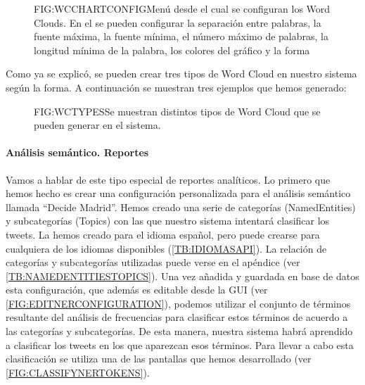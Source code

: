 \begin{figure}[Configuración de un Word Cloud]{FIG:WCCHARTCONFIG}{Menú desde el cual se configuran los Word Clouds. En el se pueden configurar la separación entre palabras, la fuente máxima, la fuente mínima, el número máximo de palabras, la longitud mínima de la palabra, los colores del gráfico y la forma}
\end{figure}
\newpage
Como ya se explicó, se pueden crear tres tipos de Word Cloud en nuestro sistema según la forma. A continuación se muestran tres ejemplos que hemos generado:

\begin{figure}[Diferentes tipos de World Cloud]{FIG:WCTYPES}{Se muestran distintos tipos de Word Cloud que se pueden generar en el sistema.}
	 \quad
	\quad
\end{figure}

\paragraph{Análisis semántico. Reportes}
Vamos a hablar de este tipo especial de reportes analíticos. Lo primero que hemos hecho es crear una configuración personalizada para el análisis semántico llamada ``Decide Madrid''. Hemos creado una serie de categorías (NamedEntities) y subcategorías (Topics) \cite{Cantador2017} con las que nuestro sistema intentará clasificar los tweets. La hemos creado para el idioma español, pero puede crearse para cualquiera de los idiomas disponibles (\ref{TB:IDIOMASAPI}). La relación de categorías y subcategorías utilizadas puede verse en el apéndice (ver \ref{TB:NAMEDENTITIESTOPICS}).
\newpage
Una vez añadida y guardada en base de datos esta configuración, que además es editable desde la GUI (ver \ref{FIG:EDITNERCONFIGURATION}), podemos utilizar el conjunto de términos resultante del análisis de frecuencias para clasificar estos términos de acuerdo a las categorías y subcategorías. De esta manera, nuestra sistema habrá aprendido a clasificar los tweets en los que aparezcan esos términos. Para llevar a cabo esta clasificación se utiliza una de las pantallas que hemos desarrollado (ver \ref{FIG:CLASSIFYNERTOKENS}).

